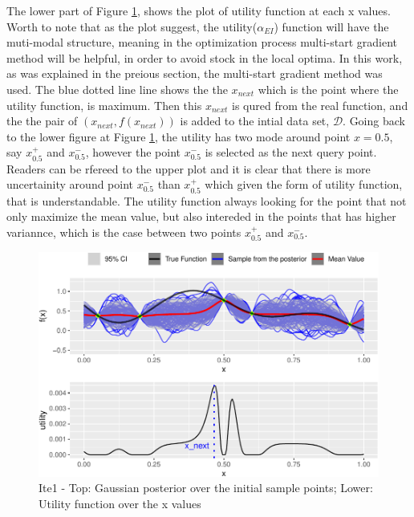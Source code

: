 \documentclass[]{elsarticle} %
\begin{document}
\begin{eqution}
The lower part of Figure \ref{fig:exampleshow}, shows the plot of utility function at each x values. Worth to note that as the plot suggest, the utility(\(\alpha_{EI}\)) function will have the muti-modal structure, meaning in the optimization process multi-start gradient method will be helpful, in order to avoid stock in the local optima. In this work, as was explained in the preious section, the multi-start gradient method was used. The blue dotted line line shows the the \(x_{next}\) which is the point where the utility function, is maximum. Then this \(x_{next}\) is qured from the real function, and the the pair of \((x_{next}, f(x_{next}))\) is added to the intial data set, \(\mathcal{D}\). Going back to the lower figure at Figure \ref{fig:exampleshow}, the utility has two mode around point \(x=0.5\), say \(x_{0.5}^+\) and \(x_{0.5}^-\), however the point \(x_{0.5}^-\) is selected as the next query point. Readers can be rfereed to the upper plot and it is clear that there is more uncertainity around point \(x_{0.5}^-\) than \(x_{0.5}^+\) which given the form of utility function, that is understandable. The utility function always looking for the point that not only maximize the mean value, but also intereded in the points that has higher variannce, which is the case between two points \(x_{0.5}^+\) and \(x_{0.5}^-\).

\begin{figure}

\includegraphics[width=1\linewidth,height=0.75\textheight]{0_Paper1_main_files/figure-latex/exampleshow-1} \hfill{}

\caption{Ite1 - Top: Gaussian posterior over the initial sample points; Lower: Utility function over the x values}\label{fig:exampleshow}
\end{figure}


\end{eqution}
\end{document}
